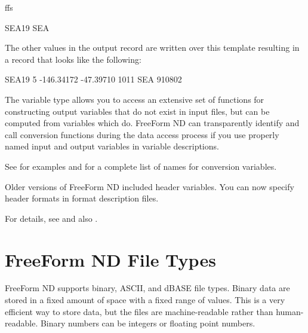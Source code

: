 \begin{description}
\begin{ifclear}{ffs}
\begin{example}
SEA19                                   SEA          
\end{example}

The other values in the output record are written over this template
resulting in a record that looks like the following:

\begin{example}
SEA19  5  -146.34172   -47.39710   1011 SEA   910802 
\end{example}


\item[\lit{convert}]
  
  The  variable type allows you to access an extensive
  set of functions for constructing output variables that do not exist
  in input files, but can be computed from variables which do.
  FreeForm ND can transparently identify and call conversion functions
  during the data access process if you use properly named input and
  output variables in variable descriptions.
  
  See  for examples and
   for a complete list of names for conversion
  variables.

\end{ifclear}

\item[\lit{header}]
  
  Older versions of FreeForm ND included header variables. You can now
  specify header formats in format description files.

  For details, see  and also
  .

\end{description}

\section{FreeForm ND File Types}

FreeForm ND supports binary, ASCII, and dBASE file types. Binary data
are stored in a fixed amount of space with a fixed range of values.
This is a very efficient way to store data, but the files are
machine-readable rather than human-readable. Binary numbers can be
integers or floating point numbers.

